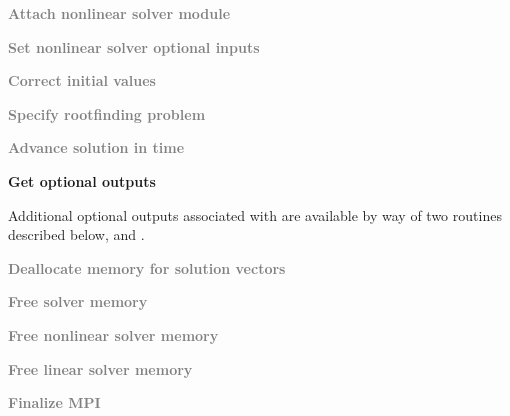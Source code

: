 {\begin{Steps}
\item
  \textcolor{gray}{\bf Attach nonlinear solver module}

\item
  \textcolor{gray}{\bf Set nonlinear solver optional inputs}

\item
  \textcolor{gray}{\bf Correct initial values}

\item
  \textcolor{gray}{\bf Specify rootfinding problem}

\item
  \textcolor{gray}{\bf Advance solution in time}

\item
  {\bf Get optional outputs}

  Additional optional outputs associated with {\idabbdpre} are available by
  way of two routines described below,
   and .

\item
  \textcolor{gray}{\bf Deallocate memory for solution vectors}

\item
  \textcolor{gray}{\bf Free solver memory}

\item
  \textcolor{gray}{\bf Free nonlinear solver memory}

\item
  \textcolor{gray}{\bf Free linear solver memory}

\item
  \textcolor{gray}{\bf Finalize MPI}


\end{Steps}}
